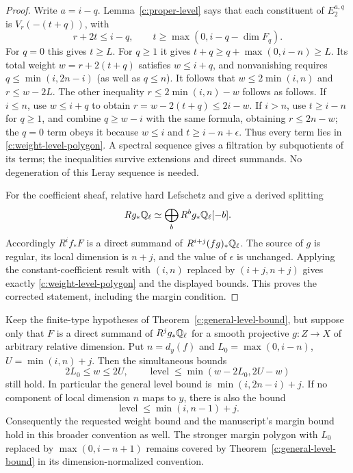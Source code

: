 \begin{proof}
Write $a=i-q$. Lemma~\ref{c:proper-level} says that each constituent of $E_2^{a,q}$ is $V_r(-(t+q))$, with
\[
 r+2t\leq i-q,
 \qquad t\geq\max(0,i-q-\dim F_q).
\]
For $q=0$ this gives $t\geq L$. For $q\geq1$ it gives $t+q\geq q+\max(0,i-n)\geq L$. Its total weight $w=r+2(t+q)$ satisfies $w\leq i+q$, and nonvanishing requires $q\leq\min(i,2n-i)$ (as well as $q\leq n$). It follows that $w\leq2\min(i,n)$ and $r\leq w-2L$. The other inequality $r\leq2\min(i,n)-w$ follows as follows. If $i\leq n$, use $w\leq i+q$ to obtain $r=w-2(t+q)\leq2i-w$. If $i>n$, use $t\geq i-n$ for $q\geq1$, and combine $q\geq w-i$ with the same formula, obtaining $r\leq2n-w$; the $q=0$ term obeys it because $w\leq i$ and $t\geq i-n+\epsilon$. Thus every term lies in \eqref{c:weight-level-polygon}. A spectral sequence gives a filtration by subquotients of its terms; the inequalities survive extensions and direct summands. No degeneration of this Leray sequence is needed.

For the coefficient sheaf, relative hard Lefschetz and \citet[Theorem 1.5 and Proposition 2.4]{c_deligne1968} give a derived splitting
\[
 Rg_*\mathbb Q_\ell\simeq\bigoplus_bR^bg_*\mathbb Q_\ell[-b].
\]
Accordingly $R^if_*F$ is a direct summand of $R^{i+j}(fg)_*\mathbb Q_\ell$. The source of $g$ is regular, its local dimension is $n+j$, and the value of $\epsilon$ is unchanged. Applying the constant-coefficient result with $(i,n)$ replaced by $(i+j,n+j)$ gives exactly \eqref{c:weight-level-polygon} and the displayed bounds. This proves the corrected statement, including the margin condition.
\end{proof}

\begin{proposition}
\label{c:broader-coefficients}
Keep the finite-type hypotheses of Theorem~\ref{c:general-level-bound}, but suppose only that $F$ is a direct summand of $R^jg_*\mathbb Q_\ell$ for a smooth projective $g:Z\to X$ of arbitrary relative dimension. Put $n=d_y(f)$ and $L_0=\max(0,i-n)$, $U=\min(i,n)+j$. Then the simultaneous bounds
\[
 2L_0\leq w\leq2U,\qquad
 \operatorname{level}\leq\min(w-2L_0,2U-w)
\]
still hold. In particular the general level bound is $\min(i,2n-i)+j$.
If no component of local dimension $n$ maps to $y$, there is also the bound
\[
 \operatorname{level}\leq\min(i,n-1)+j.
\]
Consequently the requested weight bound and the manuscript's margin bound hold in this broader convention as well. The stronger margin polygon with $L_0$ replaced by $\max(0,i-n+1)$ remains covered by Theorem~\ref{c:general-level-bound} in its dimension-normalized convention.
\end{proposition}

